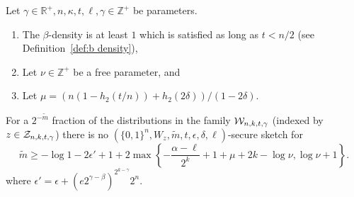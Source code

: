 \begin{theorem}
Let $\gamma \in\mathbb{R}^+, n, \kappa, t, \ell, \gamma \in\mathbb{Z}^+$ be parameters.
\begin{enumerate}
\itemsep0em
\item The $\beta$-density is at least $1$ which is  satisfied as long as $t< n/2 $ (see Definition~\ref{def:b density}),
\item Let $\nu \in \mathbb{Z}^+$ be a free parameter, and
\item Let $\mu =(n(1-h_2(t/n)) +h_2(2\delta))/(1-2\delta)$.
\end{enumerate}
For a $2^{-\tilde{m}}$ fraction of the distributions in the family $\mathcal{W}_{n,k,t,\gamma}$ (indexed by $z\in\mathcal{Z}_{n,k,t,\gamma}$) there is no $(\{0,1\}^n, W_z, \tilde{m}, t, \epsilon,\delta, \ell)$-secure sketch for 
\[
\tilde{m}\ge  -\log{1-2\epsilon'} +1 + 2\max\left\{-\frac{\alpha-\ell}{2^k}+1+\mu+2k-\log{\nu}, \log{\nu+1}\right\}.
\]
where $\epsilon' = \epsilon+\left(e2^{\gamma-\beta}\right)^{2^{k-\gamma}}2^n.$
\label{thm:main theorem ss}
\end{theorem}

